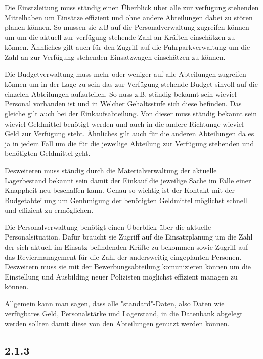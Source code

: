 \documentclass[12pt,utf8]{scrartcl}
\begin{document}
Die Einstzleitung muss ständig einen Überblick über alle zur verfügung stehenden Mittelhaben um Einsätze effizient und ohne andere Abteilungen dabei zu stören planen können. So mussen sie z.B auf die Personalverwaltung zugreifen können um um die aktuell zur verfügung stehende Zahl an Kräften einschätzen zu können. Ähnliches gilt auch für den Zugriff auf die Fuhrparkverwaltung um die Zahl an zur Verfügung stehenden Einsatzwagen einschätzen zu können.

Die Budgetverwaltung muss mehr oder weniger auf alle Abteilungen zugreifen können um in der Lage zu sein das zur Verfügung stehende Budget sinvoll auf die einzelen Abteilungen aufzuteilen. So nuss z.B. ständig bekannt sein wieviel Personal vorhanden ist und in Welcher Gehaltsstufe sich diese befinden. Das gleiche gilt auch bei der Einkaufsabteilung. Von dieser muss ständig bekannt sein wieviel Geldmittel benötigt werden und auch in die andere Richtunge wieviel Geld zur Verfügung steht. Ähnliches gilt auch für die anderen Abteilungen da es ja in jedem Fall um die für die jeweilige Abteilung zur Verfügung stehenden und benötigten Geldmittel geht.

Desweiteren muss ständig durch die Materialverwaltung der aktuelle Lagerbestand bekannt sein damit der Einkauf die jeweilige Sache im Falle einer Knappheit neu beschaffen kann. Genau so wichtig ist der Kontakt mit der Budgetabteilung um Genhmigung der benötigten Geldmittel möglichst schnell und effizient zu ermöglichen.

Die Personalverwaltung benötigt einen Überblick über die aktuelle Personalsituation. Dafür braucht sie Zugriff auf die Einsatzplanung um die Zahl der sich aktuell im Einsatz befindenden Kräfte zu bekommen sowie Zugriff auf das Reviermanagement für die Zahl der andersweitig eingeplanten Personen. Desweitern muss sie mit der Bewerbungsabteilung komunizieren können um die Einstellung und Ausbilding neuer Polizisten möglichst effizient managen zu können.

Allgemein kann man sagen, dass alle "standard"-Daten, also Daten wie verfügbares Geld, Personalstärke und Lagerstand, in die Datenbank abgelegt werden sollten damit diese von den Abteilungen genutzt werden können. 




\subsection*{2.1.3}\label{Aufgabe 2.1.3}
\end{document}
